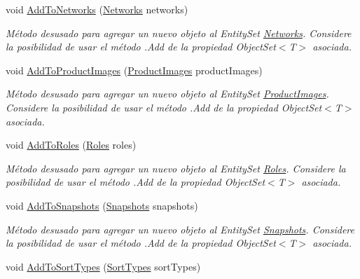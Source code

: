 \begin{DoxyCompactItemize}
void \hyperlink{class_game_memory_1_1_o_m_k_t_d_b_entities_afc390a06cb9a7e5b82313efd593e7270}{Add\-To\-Networks} (\hyperlink{class_game_memory_1_1_networks}{Networks} networks)
\begin{DoxyCompactList}\small\item\em Método desusado para agregar un nuevo objeto al Entity\-Set \hyperlink{class_game_memory_1_1_networks}{Networks}. Considere la posibilidad de usar el método .Add de la propiedad Object\-Set$<$T$>$ asociada. \end{DoxyCompactList}\item 
void \hyperlink{class_game_memory_1_1_o_m_k_t_d_b_entities_a5c406c14f2cf4d8bb0484da4ef6bbe98}{Add\-To\-Product\-Images} (\hyperlink{class_game_memory_1_1_product_images}{Product\-Images} product\-Images)
\begin{DoxyCompactList}\small\item\em Método desusado para agregar un nuevo objeto al Entity\-Set \hyperlink{class_game_memory_1_1_product_images}{Product\-Images}. Considere la posibilidad de usar el método .Add de la propiedad Object\-Set$<$T$>$ asociada. \end{DoxyCompactList}\item 
void \hyperlink{class_game_memory_1_1_o_m_k_t_d_b_entities_a5620833b74355ac64b35c8121286083a}{Add\-To\-Roles} (\hyperlink{class_game_memory_1_1_roles}{Roles} roles)
\begin{DoxyCompactList}\small\item\em Método desusado para agregar un nuevo objeto al Entity\-Set \hyperlink{class_game_memory_1_1_roles}{Roles}. Considere la posibilidad de usar el método .Add de la propiedad Object\-Set$<$T$>$ asociada. \end{DoxyCompactList}\item 
void \hyperlink{class_game_memory_1_1_o_m_k_t_d_b_entities_a603930389ff168486be58a7ecca13a0b}{Add\-To\-Snapshots} (\hyperlink{class_game_memory_1_1_snapshots}{Snapshots} snapshots)
\begin{DoxyCompactList}\small\item\em Método desusado para agregar un nuevo objeto al Entity\-Set \hyperlink{class_game_memory_1_1_snapshots}{Snapshots}. Considere la posibilidad de usar el método .Add de la propiedad Object\-Set$<$T$>$ asociada. \end{DoxyCompactList}\item 
void \hyperlink{class_game_memory_1_1_o_m_k_t_d_b_entities_a6f536afbfd7c1f5801d42b301156ed99}{Add\-To\-Sort\-Types} (\hyperlink{class_game_memory_1_1_sort_types}{Sort\-Types} sort\-Types)

\end{DoxyCompactItemize}
